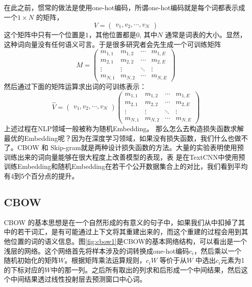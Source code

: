 \documentclass[twoside,a4paper,12pt]{book}%
\begin{document}
在此之前，惯常的做法是使用one-hot编码，所谓one-hot编码就是每个词都表示成一个$1\times N$ 的矩阵，
$$
V = \begin{pmatrix}
v_1,v_2,\cdots,v_N
\end{pmatrix}
$$
这个矩阵中只有一个位置是$1$，其他位置都是$0$, 其中$N$ 通常是词表的大小。显然，这种词向量没有任何语义可言。于是很多研究者会先生成一个可训练矩阵
$$
M=\begin{pmatrix}
m_{1,1}&m_{1,2}&\cdots&m_{1,E} \\
m_{2,1}&m_{2,2}&\cdots&m_{2,E} \\
\vdots &\vdots & \ddots & \vdots \\
m_{N,1}&m_{N,2}&\cdots&m_{N,E} 
\end{pmatrix}
$$
然后通过下面的矩阵运算求出词的可训练表示：
$$
\hat{V} =  
\begin{pmatrix}
v_1,v_2,\cdots,v_N
\end{pmatrix}
\begin{pmatrix}
m_{1,1}&m_{1,2}&\cdots&m_{1,E} \\
m_{2,1}&m_{2,2}&\cdots&m_{2,E} \\
\vdots &\vdots & \ddots & \vdots \\
m_{N,1}&m_{N,2}&\cdots&m_{N,E} 
\end{pmatrix}
$$
上述过程在\gls{NLP}领域一般被称为随机Embedding。
那么怎么去构造损失函数求解最优的Embedding呢？因为在深度学习领域，如果没有损失函数，我们什么也做不了。\gls{CBOW} 和 Skip-gram就是两种设计损失函数的方法。大量的实验表明使用预训练出来的词向量能够在很大程度上改善模型的表现，表
	\label{tab:prob4}是在TextCNN中使用预训练Embedding和随机Embedding在若干个公开数据集合上的对比，我们看到平均有4到5个百分点的提升。
\begin{table} [h]

	\label{tab:prob4}
	\centering
\end{table}

\subsection{CBOW}
\gls{CBOW} 的基本思想是在一个自然形成的有意义的句子中，如果我们从中扣掉了其中的若干词汇，是有可能通过上下文将其重建出来的，而这个重建的过程会用到其他位置的词的语义信息。图\ref{fig:cbow1}是\gls{CBOW}的基本网络结构，可以看出是一个浅层的网络。这个网络首先将样本涉及的词转换成one-hot编码$c_i$，然后乘以一个随机初始化的矩阵$W$。根据矩阵乘法运算规则，$c_iW$ 等价于从$W$ 中选出$c_i$元素为1的下标对应的$W$中的那一列。之后所有取出的列求和后形成一个中间结果，然后这个中间结果透过线性投射层去预测窗口中心词。
\end{document}
